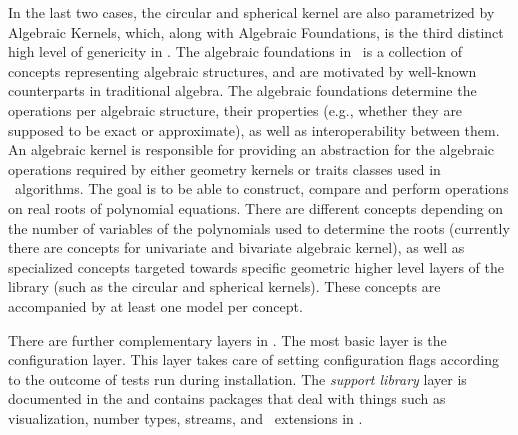 In the last two cases, the circular and spherical kernel are also
parametrized by Algebraic Kernels, which, along with Algebraic
Foundations, is the third distinct high level of genericity in
\cgal. The algebraic foundations in \cgal\ is a collection of concepts
representing algebraic structures, and are motivated by well-known
counterparts in traditional algebra. The algebraic foundations
determine the operations per algebraic structure, their properties
(e.g., whether they are supposed to be exact or approximate), as well
as interoperability between them.
%
An algebraic kernel is responsible for providing an abstraction
for the algebraic operations required by either geometry kernels or
traits classes used in \cgal\ algorithms. The goal is to be able to
construct, compare and perform operations on real roots of polynomial
equations. There are different concepts depending on the number of
variables of the polynomials used to determine the roots (currently
there are concepts for univariate and bivariate algebraic kernel), as
well as specialized concepts targeted towards specific geometric
higher level layers of the library (such as the circular and spherical
kernels). These concepts are accompanied by at least one model per
concept.

There are further complementary layers in \cgal. The most basic layer is 
the configuration layer.
This layer takes care of setting configuration flags according to the outcome
of tests run during installation.  The {\em support library} layer
 is documented in
the  and contains packages
that deal with things such as visualization, number types, streams, and
\stl\ extensions in \cgal.

